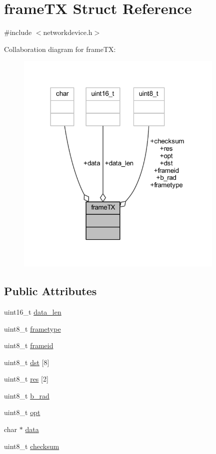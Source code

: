 \hypertarget{structframe_t_x}{}\section{frame\+TX Struct Reference}
\label{structframe_t_x}


{\ttfamily \#include $<$networkdevice.\+h$>$}



Collaboration diagram for frame\+TX\+:\nopagebreak
\begin{figure}[H]
\begin{center}
\leavevmode
\includegraphics[width=282pt]{structframe_t_x__coll__graph}
\end{center}
\end{figure}
\subsection*{Public Attributes}
\begin{DoxyCompactItemize}
\item 
uint16\+\_\+t \hyperlink{structframe_t_x_ae97c6c32cae2233e9a532f3f18acb87a}{data\+\_\+len}
\item 
uint8\+\_\+t \hyperlink{structframe_t_x_ae0184264e132f9acfedd9d73e067d749}{frametype}
\item 
uint8\+\_\+t \hyperlink{structframe_t_x_a81728989f69fb448c3107efe57d9acee}{frameid}
\item 
uint8\+\_\+t \hyperlink{structframe_t_x_ac6af0f89587bfdd91eabbc1664ed0b18}{dst} \mbox{[}8\mbox{]}
\item 
uint8\+\_\+t \hyperlink{structframe_t_x_aaa8e3f6c37ba7164586ece2aa05d02d1}{res} \mbox{[}2\mbox{]}
\item 
uint8\+\_\+t \hyperlink{structframe_t_x_a9902ea07b8e5fc897038c4a78c052d46}{b\+\_\+rad}
\item 
uint8\+\_\+t \hyperlink{structframe_t_x_a683e80dc13eeb1ab084dcc79deea00a1}{opt}
\item 
char $\ast$ \hyperlink{structframe_t_x_a03427b6b3acbd35f51927438a3366cb5}{data}
\item 
uint8\+\_\+t \hyperlink{structframe_t_x_ac11d9bcebc8ed64242ac82e05b1bcf43}{checksum}
\end{DoxyCompactItemize}


